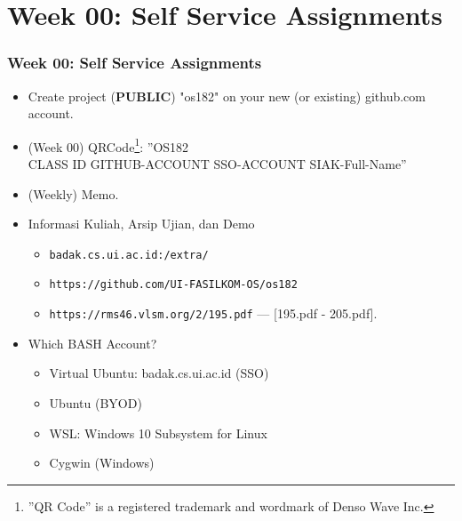 \documentclass[xcolor=table, notheorems, hyperref={pdfpagelabels=false}]{beamer}
\begin{document}
\section{Week 00: Self Service Assignments}
\begin{frame}[fragile]
\frametitle{Week 00: Self Service Assignments}
\begin{itemize}
\item Create project (\textbf{PUBLIC}) "os182" on your new (or existing) github.com account.
\item (Week 00) QRCode\footnote{%
''QR Code'' is a registered trademark and wordmark of Denso Wave Inc.}: 
''OS182\\CLASS ID GITHUB-ACCOUNT SSO-ACCOUNT SIAK-Full-Name''
\item (Weekly)  Memo.
\item Informasi Kuliah, Arsip Ujian, dan Demo
\begin{itemize}
\item \texttt{badak.cs.ui.ac.id:/extra/}
\item \texttt{https://github.com/UI-FASILKOM-OS/os182}
\item \texttt{https://rms46.vlsm.org/2/195.pdf} --- [195.pdf - 205.pdf].
\end{itemize}
\item Which BASH Account?
\begin{itemize}
\item Virtual Ubuntu: badak.cs.ui.ac.id (SSO)
\item Ubuntu (BYOD)
\item WSL: Windows 10 Subsystem for Linux
\item Cygwin (Windows)
\end{itemize}
\end{itemize}
\end{frame}


\end{document}
